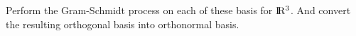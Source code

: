 \documentclass[solution,addpoints,12pt]{exam}
\begin{document}
\begin{questions}
\question Perform the Gram-Schmidt process on each of these basis for ${\rm I\!R^3}$. And convert the resulting orthogonal basis into orthonormal basis.

\end{questions}
\end{document}
